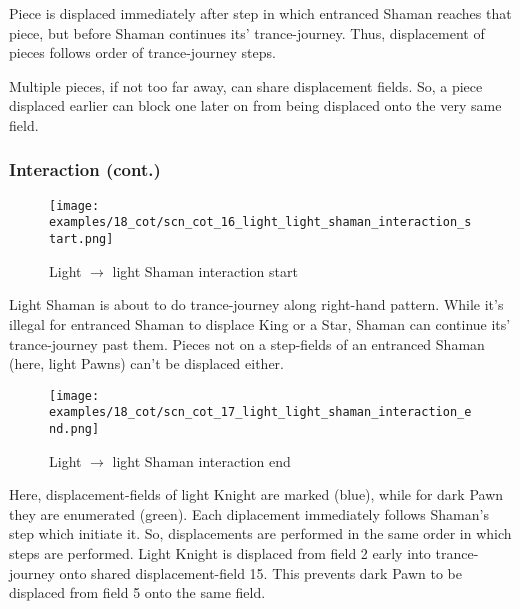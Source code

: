 Piece is displaced immediately after step in which entranced Shaman reaches that piece,
but before Shaman continues its' trance-journey. Thus, displacement of pieces follows
order of trance-journey steps.

Multiple pieces, if not too far away, can share displacement fields. So, a piece
displaced earlier can block one later on from being displaced onto the very same
field.

\clearpage %

\subsubsection*{Interaction (cont.)}

\noindent
\begin{figure}[!h]
\texttt{[image: examples/18\_cot/scn\_cot\_16\_light\_light\_shaman\_interaction\_start.png]}
\caption{Light $\rightarrow$ light Shaman interaction start}
\label{fig:scn_cot_16_light_light_shaman_interaction_start}
\end{figure}

Light Shaman is about to do trance-journey along right-hand pattern. While it's illegal
for entranced Shaman to displace King or a Star, Shaman can continue its' trance-journey
past them. Pieces not on a step-fields of an entranced Shaman (here, light Pawns) can't
be displaced either.

\clearpage %

\noindent
\begin{figure}[!h]
\texttt{[image: examples/18\_cot/scn\_cot\_17\_light\_light\_shaman\_interaction\_end.png]}
\caption{Light $\rightarrow$ light Shaman interaction end}
\label{fig:scn_cot_17_light_light_shaman_interaction_end}
\end{figure}

Here, displacement-fields of light Knight are marked (blue), while for dark Pawn they
are enumerated (green). Each diplacement immediately follows Shaman's step which initiate
it. So, displacements are performed in the same order in which steps are performed. Light
Knight is displaced from field 2 early into trance-journey onto shared displacement-field
15. This prevents dark Pawn to be displaced from field 5 onto the same field.

